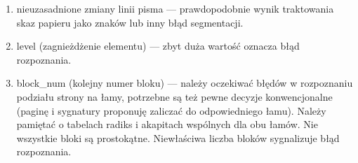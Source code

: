 \documentclass[12]{mwart}
\begin{document}
\begin{enumerate}
\item nieuzasadnione zmiany linii pisma --- prawdopodobnie wynik
  traktowania skaz papieru jako znaków lub inny błąd segmentacji.
\item level (zagnieżdżenie elementu) --- zbyt duża wartość oznacza
  błąd rozpoznania.
\item block_num (kolejny numer bloku) --- należy oczekiwać błędów w
  rozpoznaniu podziału strony na łamy, potrzebne są też pewne decyzje
  konwencjonalne (paginę i sygnatury proponuję zaliczać do
  odpowiedniego łamu). Należy pamiętać o
  tabelach radiks i akapitach wspólnych dla obu łamów. Nie wszystkie
  bloki są prostokątne. Niewłaściwa liczba bloków sygnalizuje błąd
  rozpoznania.

\end{enumerate}
\end{document}
